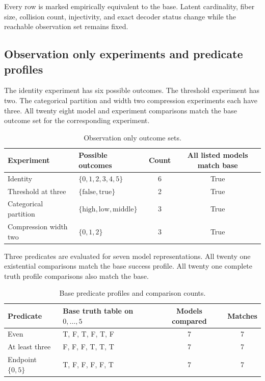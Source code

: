 Every row is marked empirically equivalent to the base. Latent cardinality, fiber size, collision count, injectivity, and exact decoder status change while the reachable observation set remains fixed.

\subsection{Observation only experiments and predicate profiles}

The identity experiment has six possible outcomes. The threshold experiment has two. The categorical partition and width two compression experiments each have three. All twenty eight model and experiment comparisons match the base outcome set for the corresponding experiment.

\begin{table}[tbp]
\centering
\caption{Observation only outcome sets.}
\label{tab:experiments}
\small
\begin{tabularx}{\textwidth}{@{}lXcc@{}}
\toprule
Experiment & Possible outcomes & Count & All listed models match base \\
\midrule
Identity & \(\{0,1,2,3,4,5\}\) & 6 & True \\
Threshold at three & \(\{\mathrm{false},\mathrm{true}\}\) & 2 & True \\
Categorical partition & \(\{\mathrm{high},\mathrm{low},\mathrm{middle}\}\) & 3 & True \\
Compression width two & \(\{0,1,2\}\) & 3 & True \\
\bottomrule
\end{tabularx}
\end{table}

Three predicates are evaluated for seven model representations. All twenty one existential comparisons match the base success profile. All twenty one complete truth profile comparisons also match the base.

\begin{table}[tbp]
\centering
\caption{Base predicate profiles and comparison counts.}
\label{tab:predicates}
\small
\begin{tabularx}{\textwidth}{@{}lXcc@{}}
\toprule
Predicate & Base truth table on \(0,\ldots,5\) & Models compared & Matches \\
\midrule
Even & T, F, T, F, T, F & 7 & 7 \\
At least three & F, F, F, T, T, T & 7 & 7 \\
Endpoint \(\{0,5\}\) & T, F, F, F, F, T & 7 & 7 \\
\bottomrule
\end{tabularx}
\end{table}

